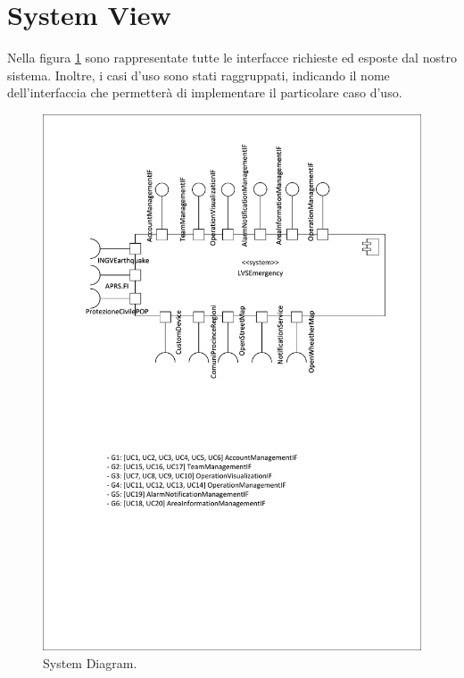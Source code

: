 \section{System View}
Nella figura \ref{fig:SystemDiagram} sono rappresentate tutte le interfacce richieste ed esposte dal nostro sistema. Inoltre, i casi d'uso sono stati raggruppati, indicando il nome dell'interfaccia che permetterà di implementare il particolare caso d'uso.

\begin{figure}[h!]
	\centering
	\includegraphics[width=0.7\linewidth]{./Iterazione 1/OtherFiles/UML - System View}
	\caption{System Diagram.}
	\label{fig:SystemDiagram}
\end{figure}